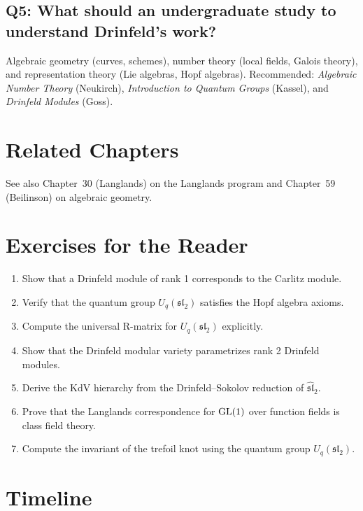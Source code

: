 \subsection*{Q5: What should an undergraduate study to understand Drinfeld's work?}
Algebraic geometry (curves, schemes), number theory (local fields, Galois theory), and representation theory (Lie algebras, Hopf algebras). Recommended: \textit{Algebraic Number Theory} (Neukirch), \textit{Introduction to Quantum Groups} (Kassel), and \textit{Drinfeld Modules} (Goss).

\section{Related Chapters}
See also Chapter~30 (Langlands) on the Langlands program and Chapter~59 (Beilinson) on algebraic geometry.

\section*{Exercises for the Reader}

\begin{enumerate}
    \item [B] Show that a Drinfeld module of rank 1 corresponds to the Carlitz module.
    \item [I] Verify that the quantum group $U_q(\mathfrak{sl}_2)$ satisfies the Hopf algebra axioms.
    \item [A] Compute the universal R-matrix for $U_q(\mathfrak{sl}_2)$ explicitly.
    \item [A] Show that the Drinfeld modular variety parametrizes rank 2 Drinfeld modules.
    \item [A] Derive the KdV hierarchy from the Drinfeld--Sokolov reduction of $\widehat{\mathfrak{sl}}_2$.
    \item [I] Prove that the Langlands correspondence for $\operatorname{GL}(1)$ over function fields is class field theory.
    \item [I] Compute the invariant of the trefoil knot using the quantum group $U_q(\mathfrak{sl}_2)$.
\end{enumerate}

\section*{Timeline}

